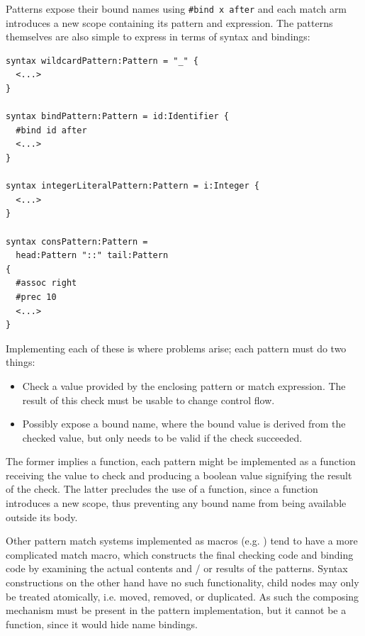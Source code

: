 \documentclass{kththesis}
\begin{document}
Patterns expose their bound names using \texttt{#bind x after} and each match arm introduces a new scope containing its pattern and expression. The patterns themselves are also simple to express in terms of syntax and bindings:

\begin{verbatim}
syntax wildcardPattern:Pattern = "_" {
  <...>
}

syntax bindPattern:Pattern = id:Identifier {
  #bind id after
  <...>
}

syntax integerLiteralPattern:Pattern = i:Integer {
  <...>
}

syntax consPattern:Pattern =
  head:Pattern "::" tail:Pattern
{
  #assoc right
  #prec 10
  <...>
}
\end{verbatim}


Implementing each of these is where problems arise; each pattern must do two things:

\begin{itemize}
  \item Check a value provided by the enclosing pattern or match expression. The result of this check must be usable to change control flow.
  \item Possibly expose a bound name, where the bound value is derived from the checked value, but only needs to be valid if the check succeeded.
\end{itemize}

The former implies a function, each pattern might be implemented as a function receiving the value to check and producing a boolean value signifying the result of the check. The latter precludes the use of a function, since a function introduces a new scope, thus preventing any bound name from being available outside its body.

Other pattern match systems implemented as macros (e.g. \cite{Tobin-Hochstadt2011Extensible-Patt}) tend to have a more complicated match macro, which constructs the final checking code and binding code by examining the actual contents and / or results of the patterns. Syntax constructions on the other hand have no such functionality, child nodes may only be treated atomically, i.e. moved, removed, or duplicated. As such the composing mechanism must be present in the pattern implementation, but it cannot be a function, since it would hide name bindings.
\end{document}
